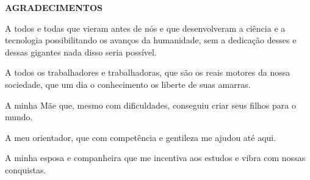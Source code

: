 \setlength{\parindent}{0pt}
\newpage \thispagestyle{empty}
\vspace{1.5cm}
\fontsize{12}{\baselineskip} \selectfont

\begin{center}
	{\huge{\textbf{AGRADECIMENTOS}}}
\end{center}

\begin{myenv}{1.5}
	\fontsize{12}{\baselineskip} \selectfont \onehalfspacing
	\par \null
	\par \null
	\par A todos e todas que vieram antes de nós e que desenvolveram a ciência e a tecnologia possibilitando os avanços da humanidade, sem a dedicação desses e dessas gigantes nada disso seria possível.
	\par A todos os trabalhadores e trabalhadoras, que são os reais motores da nossa sociedade, que um dia o conhecimento os liberte de suas amarras.
	\par A minha Mãe que, mesmo com dificuldades, conseguiu criar seus filhos para o mundo.
	\par A meu orientador, que com competência e gentileza me ajudou até aqui.
	\par A minha esposa e companheira que me incentiva aos estudos e vibra com nossas conquistas.
\end{myenv}